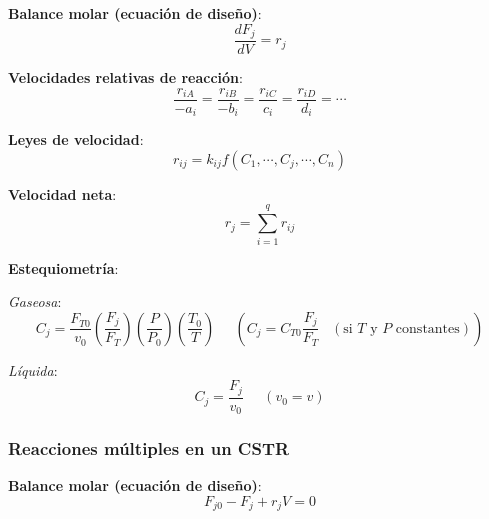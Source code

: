         \textbf{Balance molar (ecuación de diseño)}:
        \begin{equation}
            \label{eq:rxn_multiples_pfr_ec_diseno}
            \frac{d{F}_{j}}{dV} = r_{j}
        \end{equation}
        
        \textbf{Velocidades relativas de reacción}:
        \begin{equation}
            \label{eq:rxn_multiples_vel_rel}
            \frac{r_{iA}}{-a_{i}} = \frac{r_{iB}}{-b_{i}} = \frac{r_{iC}}{c_{i}} = \frac{r_{iD}}{d_{i}} = \cdots
        \end{equation}
        
        \textbf{Leyes de velocidad}:
        \begin{equation}
            \label{eq:rxn_multiples_ley_vel}
            r_{ij} = k_{ij} f \left ( C_{1},\cdots,C_{j},\cdots,C_{n} \right )
        \end{equation}
        
        \textbf{Velocidad neta}:
        \begin{equation}
            \label{eq:rxn_multiples_vel_neta}
            r_{j} = \sum_{i=1}^{q} r_{ij}
        \end{equation}
        
        \textbf{Estequiometría}:
        
        \textit{Gaseosa}:
        \begin{equation}
            \label{eq:rxn_multiples_estequiometria_gaseosa}
            C_{j} = \frac{F_{T0}}{v_{0}} \left ( \frac{F_{j}}{F_{T}} \right ) \left ( \frac{P}{P_{0}} \right ) \left ( \frac{T_{0}}{T} \right ) \;\;\;\;\; \left ( C_{j} = C_{T0}\frac{F_{j}}{F_{T}} \;\;\; \left ( \text{si } T \text{ y } P \text{ constantes} \right ) \right )
        \end{equation}
        
        \textit{Líquida}:
        \begin{equation}
            \label{eq:rxn_multiples_estequiometria_liquida}
            C_{j} = \frac{F_{j}}{v_{0}} \;\;\;\;\; \left ( v_{0} = v \right )
        \end{equation}
        
        \subsubsection{Reacciones múltiples en un CSTR}
        
        \textbf{Balance molar (ecuación de diseño)}:
        \begin{equation}
            \label{eq:rxn_multiples_cstr_ec_diseno}
            F_{j0} - F_{j} + r_{j}V = 0
        \end{equation}
        
